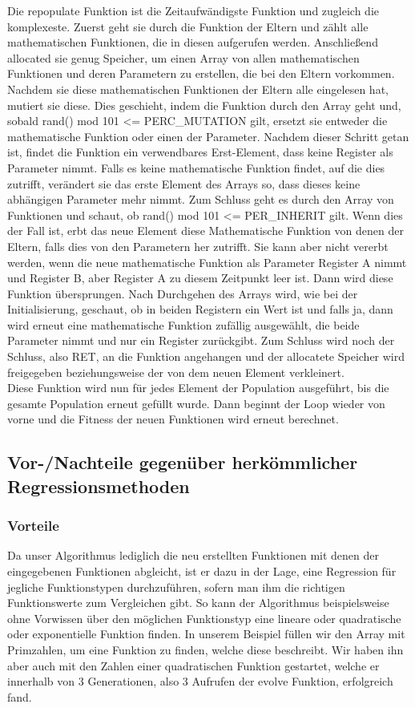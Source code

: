 \documentclass[a4paper,12pt]{article}
\begin{document}
Die repopulate Funktion ist die Zeitaufwändigste Funktion und zugleich die komplexeste. Zuerst geht sie durch die Funktion der Eltern und zählt alle mathematischen Funktionen, die in diesen aufgerufen werden. Anschließend allocated sie genug Speicher, um einen Array von allen mathematischen Funktionen und deren Parametern zu erstellen, die bei den Eltern vorkommen. Nachdem sie diese mathematischen Funktionen der Eltern alle eingelesen hat, mutiert sie diese. Dies geschieht, indem die Funktion durch den Array geht und, sobald rand() mod 101 <= PERC\_MUTATION gilt, ersetzt sie entweder die mathematische Funktion oder einen der Parameter. Nachdem dieser Schritt getan ist, findet die Funktion ein verwendbares Erst-Element, dass keine Register als Parameter nimmt. Falls es keine mathematische Funktion findet, auf die dies zutrifft, verändert sie das erste Element des Arrays so, dass dieses keine abhängigen Parameter mehr nimmt. Zum Schluss geht es durch den Array von Funktionen und schaut, ob rand() mod 101 <= PER\_INHERIT gilt. Wenn dies der Fall ist, erbt das neue Element diese Mathematische Funktion von denen der Eltern, falls dies von den Parametern her zutrifft. Sie kann aber nicht vererbt werden, wenn die neue mathematische Funktion als Parameter Register A nimmt und Register B, aber Register A zu diesem Zeitpunkt leer ist. Dann wird diese Funktion übersprungen. Nach Durchgehen des Arrays wird, wie bei der Initialisierung, geschaut, ob in beiden Registern ein Wert ist und falls ja, dann wird erneut eine mathematische Funktion zufällig ausgewählt, die beide Parameter nimmt und nur ein Register zurückgibt. Zum Schluss wird noch der Schluss, also RET, an die Funktion angehangen und der allocatete Speicher wird freigegeben beziehungsweise der von dem neuen Element verkleinert. \\

Diese Funktion wird nun für jedes Element der Population ausgeführt, bis die gesamte Population erneut gefüllt wurde. Dann beginnt der Loop wieder von vorne und die Fitness der neuen Funktionen wird erneut berechnet. \\
\newpage 

\subsection{Vor-/Nachteile gegenüber herkömmlicher Regressionsmethoden}
\subsubsection{Vorteile}
Da unser Algorithmus lediglich die neu erstellten Funktionen mit denen der eingegebenen Funktionen abgleicht, ist er dazu in der Lage, eine Regression für jegliche Funktionstypen durchzuführen, sofern man ihm die richtigen Funktionswerte zum Vergleichen gibt. So kann der Algorithmus beispielsweise ohne Vorwissen über den möglichen Funktionstyp eine lineare oder quadratische oder exponentielle Funktion finden. In unserem Beispiel füllen wir den Array mit Primzahlen, um eine Funktion zu finden, welche diese beschreibt. Wir haben ihn aber auch mit den Zahlen einer quadratischen Funktion gestartet, welche er innerhalb von 3 Generationen, also 3 Aufrufen der evolve Funktion, erfolgreich fand. \\
\end{document}
